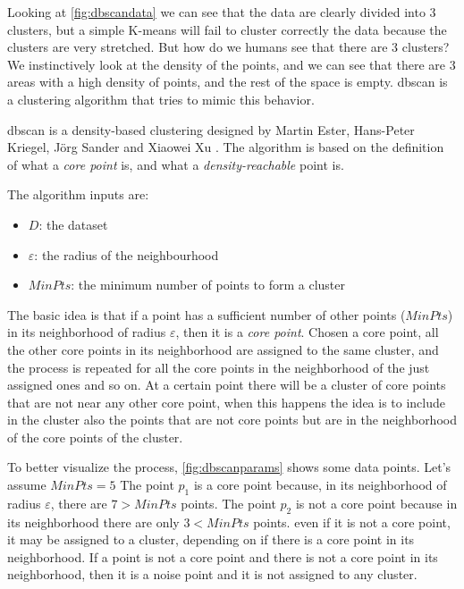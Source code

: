 Looking at \autoref{fig:dbscandata} we can see that the data are clearly divided into $3$ clusters, but a simple K-means will fail to cluster correctly the data because the clusters are very stretched. 
But how do we humans see that there are $3$ clusters? We instinctively look at the density of the points, and we can see that there are $3$ areas with a high density of points, and the rest of the space is empty. \gls{dbscan} is a clustering algorithm that tries to mimic this behavior.

\gls{dbscan} is a density-based clustering designed by Martin Ester, Hans-Peter Kriegel, Jörg Sander and Xiaowei Xu \cite{dbscan}. The algorithm is based on the definition of what a  \emph{core point} is, and what a \emph{density-reachable} point is.


The algorithm inputs are:
\begin{itemize}
    \item $D$: the dataset
    \item $\varepsilon$: the radius of the neighbourhood
    \item $MinPts$: the minimum number of points to form a cluster
\end{itemize}

The basic idea is that if a point has a sufficient number of other points ($MinPts$) in its neighborhood of radius $\varepsilon$, then it is a \emph{core point}. Chosen a core point, all the other core points in its neighborhood are assigned to the same cluster, and the process is repeated for all the core points in the neighborhood of the just assigned ones and so on. At a certain point there will be a cluster of core points that are not near any other core point, when this happens the idea is to include in the cluster also the points that are not core points but are in the neighborhood of the core points of the cluster. 

To better visualize the process, \autoref{fig:dbscanparams} shows some data points. Let's assume $MinPts = 5$ The point $p_1$ is a core point because, in its neighborhood of radius $\varepsilon$, there are $7>MinPts$ points. The point $p_2$ is not a core point because in its neighborhood there are only $3<MinPts$ points. even if it is not a core point, it may be assigned to a cluster, depending on if there is a core point in its neighborhood. If a point is not a core point and there is not a core point in its neighborhood, then it is a noise point and it is not assigned to any cluster. 

